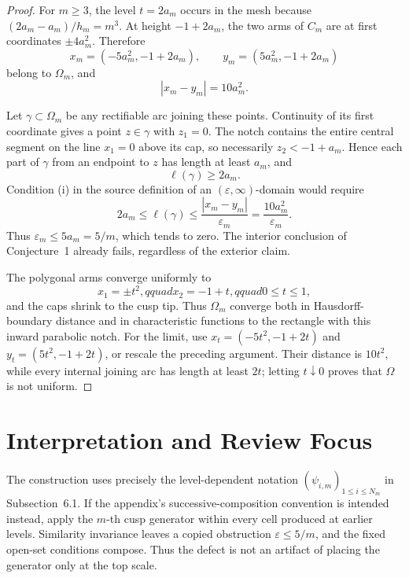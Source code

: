 \documentclass[11pt]{article}
\newcommand{\Om}{\Omega}
\begin{document}
\begin{proof}
For \(m\ge3\), the level \(t=2a_m\) occurs in the mesh because
\((2a_m-a_m)/h_m=m^3\).  At height \(-1+2a_m\), the two arms of \(C_m\)
are at first coordinates \(\pm4a_m^2\).  Therefore
\[
 x_m=(-5a_m^2,-1+2a_m),\qquad
 y_m=( 5a_m^2,-1+2a_m)
\]
belong to \(\Om_m\), and
\[
                              |x_m-y_m|=10a_m^2.
\]

Let \(\gamma\subset\Om_m\) be any rectifiable arc joining these points.
Continuity of its first coordinate gives a point \(z\in\gamma\) with
\(z_1=0\).  The notch contains the entire central segment on the line
\(x_1=0\) above its cap, so necessarily \(z_2<-1+a_m\).  Hence each part of
\(\gamma\) from an endpoint to \(z\) has length at least \(a_m\), and
\[
                              \ell(\gamma)\ge2a_m.
\]
Condition (i) in the source definition of an
\((\varepsilon,\infty)\)-domain would require
\[
 2a_m\le\ell(\gamma)\le\frac{|x_m-y_m|}{\varepsilon_m}
      =\frac{10a_m^2}{\varepsilon_m}.
\]
Thus \(\varepsilon_m\le5a_m=5/m\), which tends to zero.  The interior
conclusion of Conjecture~1 already fails, regardless of the exterior claim.

The polygonal arms converge uniformly to
\[
                 x_1=\pm t^2,qquad x_2=-1+t,qquad 0\le t\le1,
\]
and the caps shrink to the cusp tip.  Thus \(\Om_m\) converge both in
Hausdorff-boundary distance and in characteristic functions to the rectangle
with this inward parabolic notch.  For the limit, use
\(x_t=(-5t^2,-1+2t)\) and \(y_t=(5t^2,-1+2t)\), or rescale the preceding
argument.  Their distance is \(10t^2\), while every internal joining arc has
length at least \(2t\); letting \(t\downarrow0\) proves that \(\Om\) is not
uniform.
\end{proof}

\section*{Interpretation and Review Focus}

The construction uses precisely the level-dependent notation
\((\psi_{i,m})_{1\le i\le N_m}\) in Subsection~6.1.  If the appendix's
successive-composition convention is intended instead, apply the \(m\)-th
cusp generator within every cell produced at earlier levels.  Similarity
invariance leaves a copied obstruction \(\varepsilon\le5/m\), and the fixed
open-set conditions compose.  Thus the defect is not an artifact of placing
the generator only at the top scale.
\end{document}
